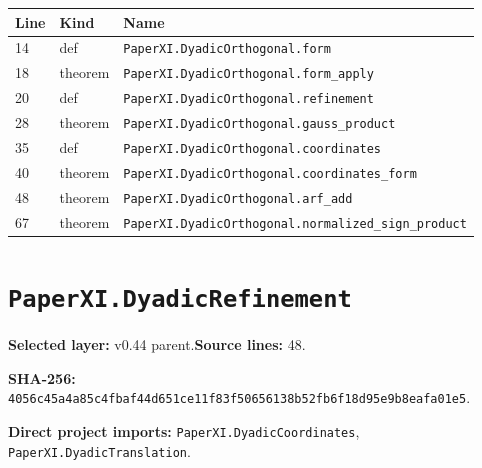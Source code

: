 \documentclass[10pt,oneside]{book}
\begin{document}
\begin{longtable}{@{}p{}p{}p{}@{}}\toprule Line&Kind&Name\\\midrule\endhead

14&def&\nolinkurl{PaperXI.DyadicOrthogonal.form}\\

18&theorem&\nolinkurl{PaperXI.DyadicOrthogonal.form_apply}\\

20&def&\nolinkurl{PaperXI.DyadicOrthogonal.refinement}\\

28&theorem&\nolinkurl{PaperXI.DyadicOrthogonal.gauss_product}\\

35&def&\nolinkurl{PaperXI.DyadicOrthogonal.coordinates}\\

40&theorem&\nolinkurl{PaperXI.DyadicOrthogonal.coordinates_form}\\

48&theorem&\nolinkurl{PaperXI.DyadicOrthogonal.arf_add}\\

67&theorem&\nolinkurl{PaperXI.DyadicOrthogonal.normalized_sign_product}\\

\bottomrule\end{longtable}

\section{\texorpdfstring{\nolinkurl{PaperXI.DyadicRefinement}}{PaperXI.DyadicRefinement}}\label{module:PaperXI.DyadicRefinement}

\textbf{Selected layer:} v0.44 parent.\quad\textbf{Source lines:} 48.\par\textbf{SHA-256:} {\scriptsize\nolinkurl{4056c45a4a85c4fbaf44d651ce11f83f50656138b52fb6f18d95e9b8eafa01e5}}.


\textbf{Direct project imports:} \nolinkurl{PaperXI.DyadicCoordinates}, \nolinkurl{PaperXI.DyadicTranslation}.
\end{document}
